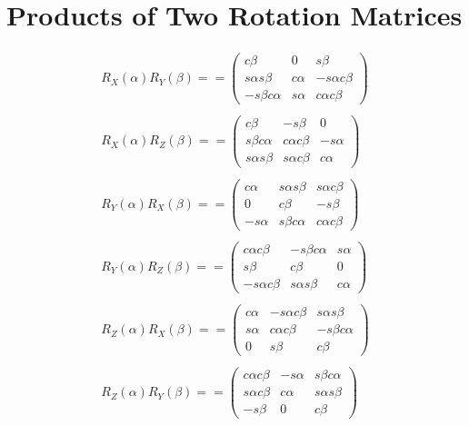 \documentclass[10pt, letterpaper]{report}
\begin{document}
\section*{Products of Two Rotation Matrices}\begin{eqnarray*}R_{X}(\alpha)R_{Y}(\beta)==\begin{pmatrix}
 c \beta & 0 &  s \beta \\ 
 s \alpha s \beta &  c \alpha & - s \alpha c \beta \\ 
- s \beta c \alpha &  s \alpha &  c \alpha c \beta 
\end{pmatrix} \\ \\ 
R_{X}(\alpha)R_{Z}(\beta)==\begin{pmatrix}
 c \beta & - s \beta & 0 \\ 
 s \beta c \alpha &  c \alpha c \beta & - s \alpha \\ 
 s \alpha s \beta &  s \alpha c \beta &  c \alpha 
\end{pmatrix} \\ \\ 
R_{Y}(\alpha)R_{X}(\beta)==\begin{pmatrix}
 c \alpha &  s \alpha s \beta &  s \alpha c \beta \\ 
0 &  c \beta & - s \beta \\ 
- s \alpha &  s \beta c \alpha &  c \alpha c \beta 
\end{pmatrix} \\ \\ 
R_{Y}(\alpha)R_{Z}(\beta)==\begin{pmatrix}
 c \alpha c \beta & - s \beta c \alpha &  s \alpha \\ 
 s \beta &  c \beta & 0 \\ 
- s \alpha c \beta &  s \alpha s \beta &  c \alpha 
\end{pmatrix} \\ \\ 
R_{Z}(\alpha)R_{X}(\beta)==\begin{pmatrix}
 c \alpha & - s \alpha c \beta &  s \alpha s \beta \\ 
 s \alpha &  c \alpha c \beta & - s \beta c \alpha \\ 
0 &  s \beta &  c \beta 
\end{pmatrix} \\ \\ 
R_{Z}(\alpha)R_{Y}(\beta)==\begin{pmatrix}
 c \alpha c \beta & - s \alpha &  s \beta c \alpha \\ 
 s \alpha c \beta &  c \alpha &  s \alpha s \beta \\ 
- s \beta & 0 &  c \beta 
\end{pmatrix} 
\end{eqnarray*}
\end{document}
